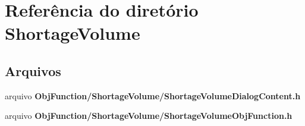 \section{Referência do diretório Shortage\+Volume}
\label{dir_531bbbc7edc4c5286f61c805cb0df290}
\subsection*{Arquivos}
\begin{DoxyCompactItemize}
\item 
arquivo {\bf Obj\+Function/\+Shortage\+Volume/\+Shortage\+Volume\+Dialog\+Content.\+h}
\item 
arquivo {\bf Obj\+Function/\+Shortage\+Volume/\+Shortage\+Volume\+Obj\+Function.\+h}
\end{DoxyCompactItemize}
